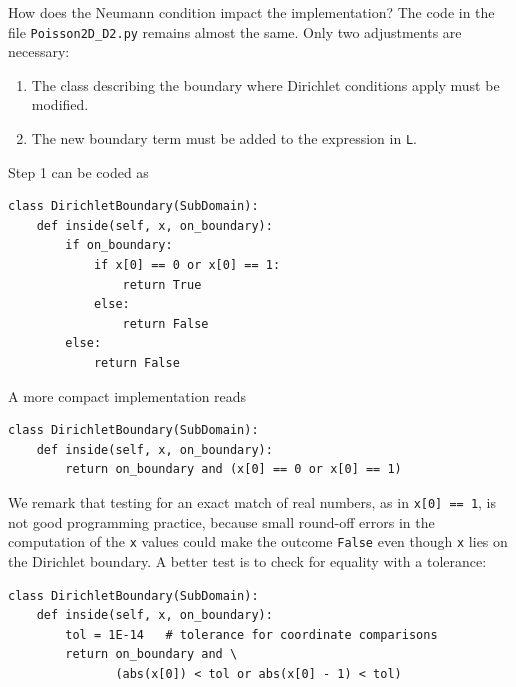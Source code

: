 How does the Neumann condition impact the implementation?
The code in the file {\fontsize{12pt}{12pt}\verb!Poisson2D_D2.py!} remains almost the same.
Only two adjustments are necessary:
\begin{enumerate}
\item The class describing the boundary where Dirichlet conditions
apply must be modified.
\item The new boundary term must be added to the expression in {\fontsize{12pt}{12pt}\verb!L!}.
\end{enumerate}
Step 1 can be coded as
\begin{Verbatim}[fontsize=\fontsize{10pt}{10pt},tabsize=8,baselinestretch=1.05,
fontfamily=tt,xleftmargin=7mm]
class DirichletBoundary(SubDomain):
    def inside(self, x, on_boundary):
        if on_boundary:
            if x[0] == 0 or x[0] == 1:
                return True
            else:
                return False
        else:
            return False
\end{Verbatim}
\noindent
A more compact implementation reads
\begin{Verbatim}[fontsize=\fontsize{10pt}{10pt},tabsize=8,baselinestretch=1.05,
fontfamily=tt,xleftmargin=7mm]
class DirichletBoundary(SubDomain):
    def inside(self, x, on_boundary):
        return on_boundary and (x[0] == 0 or x[0] == 1)
\end{Verbatim}
\noindent
We remark that testing for an exact match of real numbers,
as in {\fontsize{12pt}{12pt}\verb!x[0] == 1!}, is not good programming practice, because
small round-off errors in the computation of the {\fontsize{12pt}{12pt}\texttt{x}} values
could make the outcome {\fontsize{12pt}{12pt}\verb!False!} even though
{\fontsize{12pt}{12pt}\verb!x!} lies on the Dirichlet boundary. A better test is to
check for equality with a tolerance:
\begin{Verbatim}[fontsize=\fontsize{10pt}{10pt},tabsize=8,baselinestretch=1.05,
fontfamily=tt,xleftmargin=7mm]
class DirichletBoundary(SubDomain):
    def inside(self, x, on_boundary):
        tol = 1E-14   # tolerance for coordinate comparisons
        return on_boundary and \
               (abs(x[0]) < tol or abs(x[0] - 1) < tol)
\end{Verbatim}
\noindent


